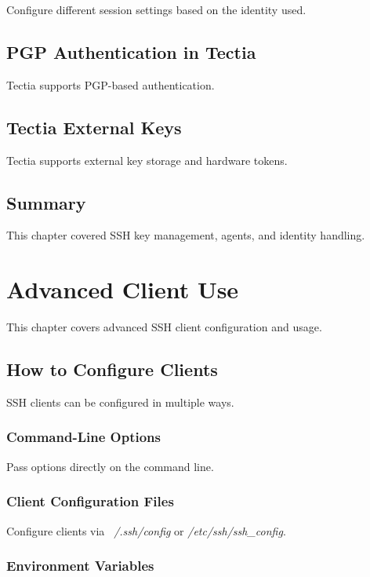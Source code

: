 \documentclass[12pt]{book}
\begin{document}
Configure different session settings based on the identity used.

\section{PGP Authentication in Tectia}

Tectia supports PGP-based authentication.

\section{Tectia External Keys}

Tectia supports external key storage and hardware tokens.

\section{Summary}

This chapter covered SSH key management, agents, and identity handling.

\chapter{Advanced Client Use}

This chapter covers advanced SSH client configuration and usage.

\section{How to Configure Clients}

SSH clients can be configured in multiple ways.

\subsection{Command-Line Options}

Pass options directly on the command line.

\subsection{Client Configuration Files}

Configure clients via \textit{~/.ssh/config} or \textit{/etc/ssh/ssh\_config}.

\subsection{Environment Variables}
\end{document}
